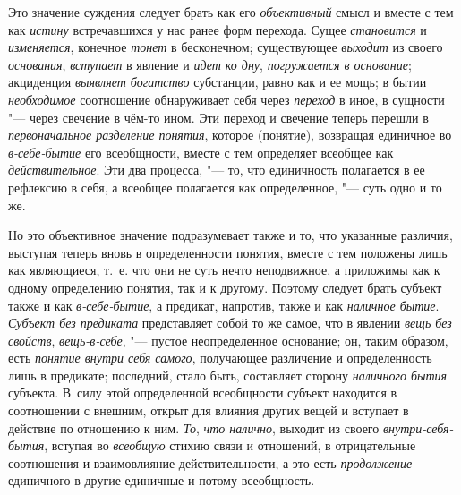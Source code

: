 \label{bkm:bm31a}Это значение суждения следует брать как его
{\em объективный} смысл и
вместе с тем как {\em истину}
встречавшихся у нас ранее форм перехода. Сущее
{\em становится} и
{\em изменяется},
конечное {\em тонет}
в бесконечном; существующее
{\em выходит} из своего
{\em основания},
{\em вступает} в явление и
{\em идет ко дну},
{\em погружается в основание};
акциденция {\em выявляет
богатство }субстанции, равно как и ее мощь; в бытии
{\em необходимое}
соотношение обнаруживает себя через
{\em переход} в иное, в
сущности "--- через свечение в чём-то ином. Эти переход и
свечение теперь перешли в
{\em первоначальное разделение
понятия}, которое (понятие), возвращая единичное во
{\em в-себе-бытие} его
всеобщности, вместе с тем определяет всеобщее как
{\em действительное}. Эти
два процесса, "--- то, что единичность полагается в ее
рефлексию в себя, а всеобщее полагается как определенное, "---
суть одно и то же.

Но это объективное значение подразумевает также и то, что
указанные различия, выступая теперь вновь в определенности понятия, вместе
с тем положены лишь как являющиеся, т.~е. что они не суть нечто
неподвижное, а приложимы как к одному определению понятия, так и к другому.
Поэтому следует брать субъект также и как
{\em в-себе-бытие}, а
предикат, напротив, также и как
{\em наличное бытие}.
{\em Субъект без предиката}
представляет собой то же самое, что в явлении
{\em вещь без свойств},
{\em вещь-в-себе}, "---
пустое неопределенное основание; он, таким образом, есть
{\em понятие внутри себя самого},
получающее различение и определенность лишь в предикате;
последний, стало быть, составляет сторону
{\em наличного бытия}
субъекта. В~силу этой определенной всеобщности субъект
находится в соотношении с внешним, открыт для влияния других вещей и
вступает в действие по отношению к ним.
{\em То},
{\em что налично}, выходит
из своего {\em внутри-себя-бытия},
вступая во {\em всеобщую}
стихию связи и отношений, в отрицательные соотношения и
взаимовлияние действительности, а это есть
{\em продолжение}
единичного в другие единичные и потому всеобщность.

